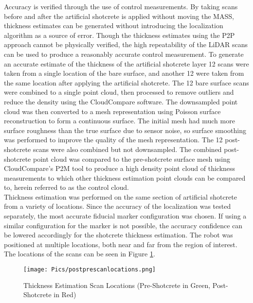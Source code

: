 Accuracy is verified through the use of control measurements. By taking scans before and after the artificial shotcrete is applied without moving the MASS, thickness estimates can be generated without introducing the localization algorithm as a source of error. Though the thickness estimates using the P2P approach cannot be physically verified, the high repeatability of the LiDAR scans can be used to produce a reasonably accurate control measurement. To generate an accurate estimate of the thickness of the artificial shotcrete layer 12 scans were taken from a single location of the bare surface, and another 12 were taken from the same location after applying the artificial shotcrete. The 12 bare surface scans were combined to a single point cloud, then processed to remove outliers and reduce the density using the CloudCompare software. The downsampled point cloud was then converted to a mesh representation using Poisson surface reconstruction to form a continuous surface. The initial mesh had much more surface roughness than the true surface due to sensor noise, so surface smoothing was performed to improve the quality of the mesh representation. The 12 post-shotcrete scans were also combined but not downsampled. The combined post-shotcrete point cloud was compared to the pre-shotcrete surface mesh using CloudCompare's P2M tool to produce a high density point cloud of thickness measurements to which other thickness estimation point clouds can be compared to, herein referred to as the control cloud.\\

Thickness estimation was performed on the same section of artificial shotcrete from a variety of locations. Since the accuracy of the localization was tested separately, the most accurate fiducial marker configuration was chosen. If using a similar configuration for the marker is not possible, the accuracy confidence can be lowered accordingly for the shotcrete thickness estimation. The robot was positioned at multiple locations, both near and far from the region of interest. The locations of the scans can be seen in Figure \ref{fig:thickscans}.\\

\begin{figure}
    \centering
    \texttt{[image: Pics/postprescanlocations.png]}
    \caption{Thickness Estimation Scan Locations (Pre-Shotcrete in Green, Post-Shotcrete in Red)}
    \label{fig:thickscans}
\end{figure}

